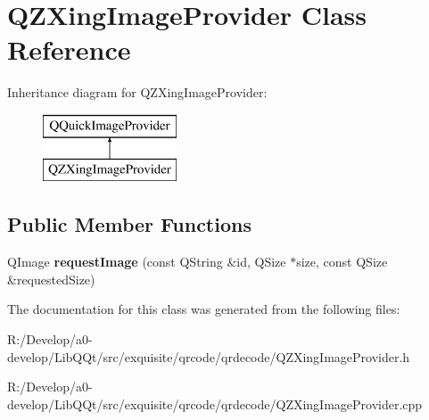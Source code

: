 \hypertarget{class_q_z_xing_image_provider}{}\section{Q\+Z\+Xing\+Image\+Provider Class Reference}
\label{class_q_z_xing_image_provider}
Inheritance diagram for Q\+Z\+Xing\+Image\+Provider\+:\begin{figure}[H]
\begin{center}
\leavevmode
\includegraphics[height=2.000000cm]{class_q_z_xing_image_provider}
\end{center}
\end{figure}
\subsection*{Public Member Functions}
\begin{DoxyCompactItemize}
\item 
\mbox{\label{class_q_z_xing_image_provider_afa3154c3ba930b34d9977a074d9b7c41}} 
Q\+Image {\bfseries request\+Image} (const Q\+String \&id, Q\+Size $\ast$size, const Q\+Size \&requested\+Size)
\end{DoxyCompactItemize}


The documentation for this class was generated from the following files\+:\begin{DoxyCompactItemize}
\item 
R\+:/\+Develop/a0-\/develop/\+Lib\+Q\+Qt/src/exquisite/qrcode/qrdecode/Q\+Z\+Xing\+Image\+Provider.\+h\item 
R\+:/\+Develop/a0-\/develop/\+Lib\+Q\+Qt/src/exquisite/qrcode/qrdecode/Q\+Z\+Xing\+Image\+Provider.\+cpp\end{DoxyCompactItemize}
